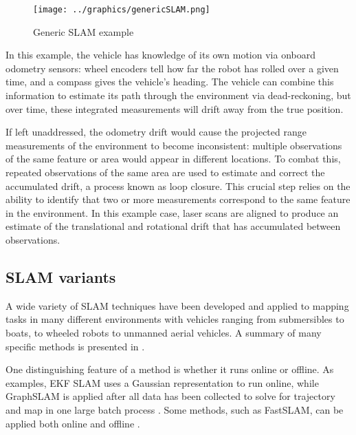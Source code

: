  \begin{figure}[!htb]
   \centering
   \texttt{[image: ../graphics/genericSLAM.png]} %
   \caption{ Generic SLAM example}
   \label{fig:GenericSLAM}
\end{figure}


In this example, the vehicle has knowledge of its own motion via onboard odometry sensors: wheel encoders tell how far the robot has rolled over a given time, and a compass gives the vehicle's heading. The vehicle can combine this information to estimate its path through the environment via dead-reckoning, but over time, these integrated measurements will drift away from the true position.

If left unaddressed, the odometry drift would cause the projected range measurements of the environment to become inconsistent: multiple observations of the same feature or area would appear in different locations. To combat this, repeated observations of the same area are used to estimate and correct the accumulated drift, a process known as loop closure. This crucial step relies on the ability to identify that two or more measurements correspond to the same feature in the environment. In this example case, laser scans are aligned to produce an estimate of the translational and rotational drift that has accumulated between observations. 


\subsection{SLAM variants}

A wide variety of SLAM techniques have been developed and applied to mapping tasks in many different environments with vehicles ranging from submersibles to boats, to wheeled robots to unmanned aerial vehicles. A summary of many specific methods is presented in \cite{SLAMoverview}. 

One distinguishing feature of a method is whether it runs online or offline. As examples, EKF SLAM uses a Gaussian representation to run online, while GraphSLAM is applied after all data has been collected to solve for trajectory and map in one large batch process \cite{Thrun2005}. Some methods, such as FastSLAM, can be applied both online and offline \cite{Montemerlo2002}.

